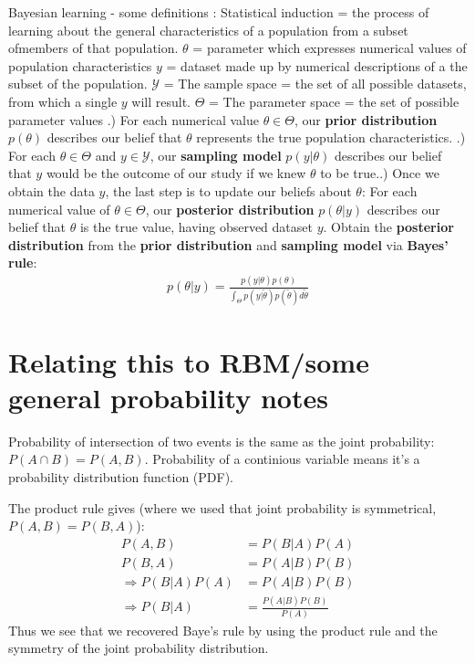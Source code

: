 \documentclass[norsk,a4paper,11pt]{article}
\begin{document}
Bayesian learning - some definitions \cite{bayeshoff}: \linebreak
Statistical induction = the process of learning about the general characteristics of a population from a subset ofmembers of that population. \linebreak
$\theta$ = parameter which expresses numerical values of population characteristics \linebreak
$y$ = dataset made up by numerical descriptions of a the subset of the population. \linebreak
$\mathcal{Y}$ = The sample space = the set of all possible datasets, from which a single $y$ will result. \linebreak
$\Theta$ = The parameter space = the set of possible parameter values .) For each numerical value $\theta \in \Theta$, our \textbf{prior distribution} $p(\theta)$ describes our belief that $\theta$ represents the true population characteristics. .) For each $\theta \in \Theta$ and $y \in \mathcal{Y}$, our \textbf{sampling model} $p(y|\theta)$ describes our belief that $y$ would be the outcome of our study if we knew $\theta$ to be true..) Once we obtain the data $y$, the last step is to update our beliefs about $\theta$: For each numerical value of $\theta \in \Theta$, our \textbf{posterior distribution} $p(\theta|y)$ describes our belief that $\theta$ is the true value, having observed dataset $y$. \linebreak \linebreak
Obtain the \textbf{posterior distribution} from the \textbf{prior distribution} and \textbf{sampling model} via \textbf{Bayes' rule}:
\begin{align}
	p(\theta|y) = \frac{p(y|\theta) p(\theta)}{\int_\Theta p(y|\tilde{\theta})p(\tilde{\theta})d\tilde{\theta}}
\end{align}


\section{Relating this to RBM/some general probability notes}
Probability of intersection of two events is the same as the joint probability: $P(A \cap B) = P(A, B)$. Probability of a continious variable means it's a probability distribution function (PDF).

The product rule gives (where we used that joint probability is symmetrical, $P(A,B)=P(B,A)$):
\begin{align}
	P(A, B) &= P(B|A)P(A) \\
	P(B, A) &= P(A|B)P(B) \\
	\Rightarrow P(B|A)P(A) &= P(A|B)P(B) \\
	\Rightarrow P(B|A) & = \frac{P(A|B)P(B)}{P(A)}
\end{align}
Thus we see that we recovered Baye's rule by using the product rule and the symmetry of the joint probability distribution.
\end{document}
